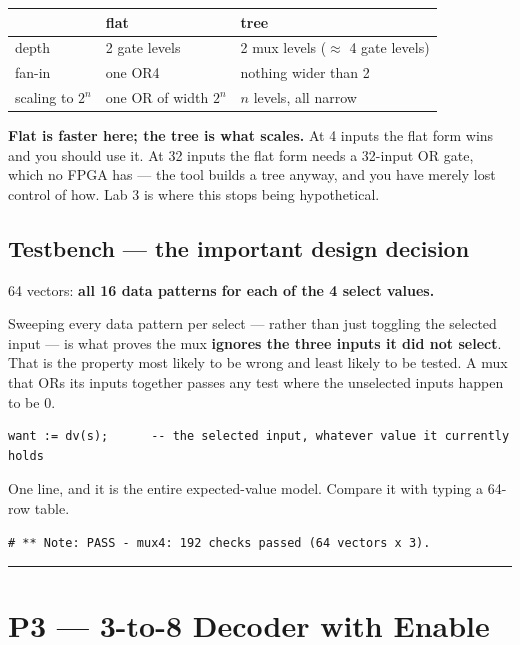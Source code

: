 \documentclass[11pt]{article}
\newcommand{\hr}{\vspace{2pt}\hrule\vspace{6pt}}
\begin{document}
\begin{center}
\begin{tabular}{lll}
\toprule
& flat & tree \\
\midrule
depth & 2 gate levels & 2 mux levels ($\approx$ 4 gate levels) \\
fan-in & one OR4 & nothing wider than 2 \\
scaling to $2^n$ & one OR of width $2^n$ & $n$ levels, all narrow \\
\bottomrule
\end{tabular}
\end{center}

\textbf{Flat is faster here; the tree is what scales.} At 4 inputs the flat form
wins and you should use it. At 32 inputs the flat form needs a 32-input OR gate,
which no FPGA has --- the tool builds a tree anyway, and you have merely lost
control of how. Lab 3 is where this stops being hypothetical.

\subsection*{Testbench --- the important design decision}

64 vectors: \textbf{all 16 data patterns for each of the 4 select values.}

Sweeping every data pattern per select --- rather than just toggling the selected
input --- is what proves the mux \textbf{ignores the three inputs it did not
select}. That is the property most likely to be wrong and least likely to be tested.
A mux that ORs its inputs together passes any test where the unselected inputs
happen to be $0$.

\begin{lstlisting}
want := dv(s);      -- the selected input, whatever value it currently holds
\end{lstlisting}

One line, and it is the entire expected-value model. Compare it with typing a
64-row table.

\begin{lstlisting}
# ** Note: PASS - mux4: 192 checks passed (64 vectors x 3).
\end{lstlisting}

\vspace{4pt}\hr

\section*{P3 --- 3-to-8 Decoder with Enable}
\end{document}
